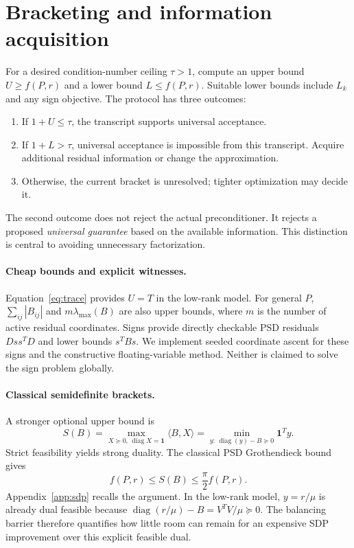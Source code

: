 \documentclass[final,leqno,letterpaper]{etna}
\renewcommand{\diag}{\operatorname{diag}}
\begin{document}
\section{Bracketing and information acquisition}
For a desired condition-number ceiling $\tau>1$, compute an upper bound $U\ge f(P,r)$ and a lower bound $L\le f(P,r)$. Suitable lower bounds include $L_k$ and any sign objective. The protocol has three outcomes:
\begin{enumerate}
\item If $1+U\le\tau$, the transcript supports universal acceptance.
\item If $1+L>\tau$, universal acceptance is impossible from this transcript. Acquire additional residual information or change the approximation.
\item Otherwise, the current bracket is unresolved; tighter optimization may decide it.
\end{enumerate}
The second outcome does not reject the actual preconditioner. It rejects a proposed \emph{universal guarantee} based on the available information. This distinction is central to avoiding unnecessary factorization.

\paragraph{Cheap bounds and explicit witnesses.}
Equation~\eqref{eq:trace} provides $U=T$ in the low-rank model. For general $P$, $\sum_{ij}|B_{ij}|$ and $m\lambda_{\max}(B)$ are also upper bounds, where $m$ is the number of active residual coordinates. Signs provide directly checkable PSD residuals $Ds s^TD$ and lower bounds $s^TBs$. We implement seeded coordinate ascent for these signs and the constructive floating-variable method. Neither is claimed to solve the sign problem globally.

\paragraph{Classical semidefinite brackets.}
A stronger optional upper bound is
\begin{equation}\label{eq:sdp}
 S(B)=\max_{X\succeq0,\,\diag X=\mathbf1}\langle B,X\rangle
 =\min_{y:\,\diag(y)-B\succeq0}\mathbf1^Ty.
\end{equation}
Strict feasibility yields strong duality. The classical PSD Grothendieck bound gives
\begin{equation*}
 f(P,r)\le S(B)\le\frac{\pi}{2}f(P,r).
\end{equation*}
Appendix~\ref{app:sdp} recalls the argument. In the low-rank model, $y=r/\mu$ is already dual feasible because $\diag(r/\mu)-B=V^TV/\mu\succeq0$. The balancing barrier therefore quantifies how little room can remain for an expensive SDP improvement over this explicit feasible dual.
\end{document}
